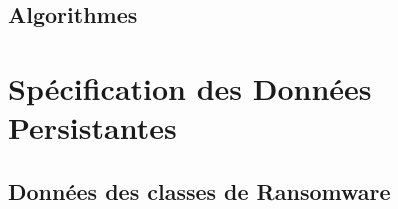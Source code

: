 \documentclass[a4paper, 12pt, twoside]{article}
\begin{document}
\begin{figure}[!h]
\caption{}
\end{figure}

\newpage
\begin{figure}[!h]
\caption{}
\end{figure}
\begin{figure}[!h]
\caption{}
\end{figure}


\subsection{Algorithmes}

\section{Spécification des Données Persistantes}
\subsection{Données des classes de Ransomware}
\end{document}
